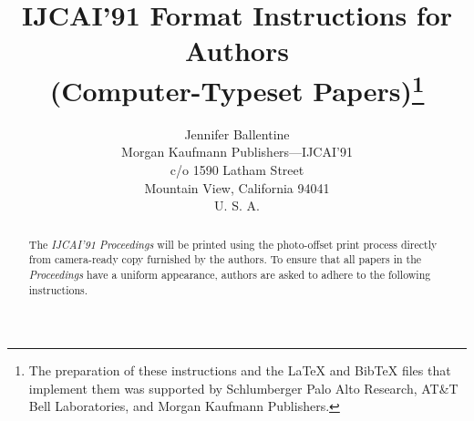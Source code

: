  



\title{IJCAI'91 Format Instructions for Authors\\(Computer-Typeset
Papers)\thanks{The preparation of these 
instructions and the \LaTeX{} and Bib\TeX{} files that implement them was
supported by Schlumberger Palo Alto Research, AT\&T Bell Laboratories, and
Morgan Kaufmann Publishers.}\\}
\author{Jennifer Ballentine\\
	Morgan Kaufmann Publishers---IJCAI'91\\
	c/o 1590 Latham Street\\
	Mountain View, California \hspace{1em} 94041\\
	U. S. A.
	}



\maketitle

\begin{abstract}
The {\it IJCAI'91 Proceedings} will be printed using the photo-offset print
process directly from camera-ready copy furnished by the authors.  To
ensure that all papers in the {\it Proceedings} have a uniform appearance,
authors are asked to adhere to the following instructions.  
\end{abstract}


